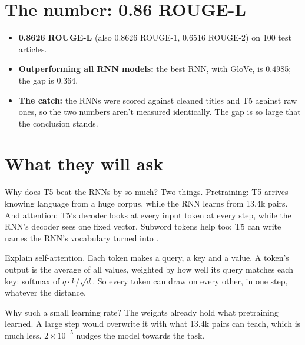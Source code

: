\section{The number: 0.86 ROUGE-L}

\begin{measured}
\begin{itemize}
  \item \textbf{0.8626 ROUGE-L} (also 0.8626 ROUGE-1, 0.6516 ROUGE-2) on 100 test articles.
  \item \textbf{Outperforming all RNN models:} the best RNN, with GloVe, is 0.4985; the gap is 0.364.
  \item \textbf{The catch:} the RNNs were scored against cleaned titles and T5 against raw ones, so the two numbers aren't measured identically. The gap is so large that the conclusion stands.
\end{itemize}
\end{measured}

\section{What they will ask}

\begin{iq}[\core]{Why does T5 beat the RNNs by so much?}
Two things. Pretraining: T5 arrives knowing language from a huge corpus, while the RNN learns from 13.4k pairs. And attention: T5's decoder looks at every input token at every step, while the RNN's decoder sees one fixed vector. Subword tokens help too: T5 can write names the RNN's vocabulary turned into .
\end{iq}

\begin{iq}[\core]{Explain self-attention.}
Each token makes a query, a key and a value. A token's output is the average of all values, weighted by how well its query matches each key: softmax of $q \cdot k / \sqrt d$. So every token can draw on every other, in one step, whatever the distance.
\end{iq}

\begin{iq}[\core]{Why such a small learning rate?}
The weights already hold what pretraining learned. A large step would overwrite it with what 13.4k pairs can teach, which is much less. $2\times10^{-5}$ nudges the model towards the task.
\end{iq}

